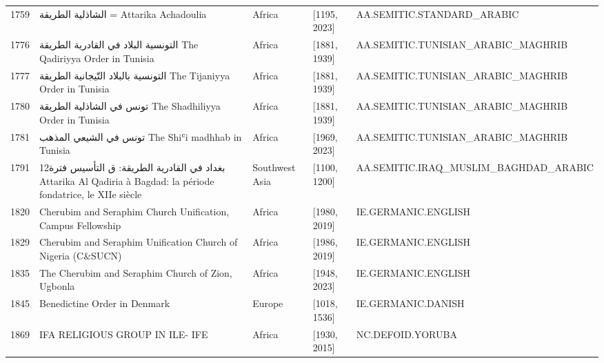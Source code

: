 {\begin{longtable}{rp{3.5cm}llp{3.5cm}}
1759 & {\raggedright {\arabicfont الشاذلية الطريقة} = Attarika Achadoulia} & Africa & [1195, 2023] & {\raggedright AA.\allowbreak{}SEMITIC.\allowbreak{}STANDARD\_\allowbreak{}ARABIC} \\
1776 & {\raggedright {\arabicfont التونسية البلاد في القادرية الطريقة} The Qadiriyya Order in Tunisia} & Africa & [1881, 1939] & {\raggedright AA.\allowbreak{}SEMITIC.\allowbreak{}TUNISIAN\_\allowbreak{}ARABIC\_\allowbreak{}MAGHRIB} \\
1777 & {\raggedright {\arabicfont التونسية بالبلاد التّيجانية الطريقة} The Tijaniyya Order in Tunisia} & Africa & [1881, 1939] & {\raggedright AA.\allowbreak{}SEMITIC.\allowbreak{}TUNISIAN\_\allowbreak{}ARABIC\_\allowbreak{}MAGHRIB} \\
1780 & {\raggedright {\arabicfont تونس في الشاذلية الطريقة} The Shadhiliyya Order in Tunisia} & Africa & [1881, 1939] & {\raggedright AA.\allowbreak{}SEMITIC.\allowbreak{}TUNISIAN\_\allowbreak{}ARABIC\_\allowbreak{}MAGHRIB} \\
1781 & {\raggedright {\arabicfont تونس في الشيعي المذهب} The Shiʿi madhhab in Tunisia} & Africa & [1969, 2023] & {\raggedright AA.\allowbreak{}SEMITIC.\allowbreak{}TUNISIAN\_\allowbreak{}ARABIC\_\allowbreak{}MAGHRIB} \\
1791 & {\raggedright {\arabicfont بغداد في القادرية الطريقة}: {\arabicfont ق التأسيس فترة}12 Attarika Al Qadiria à Bagdad: la période fondatrice, le XIIe siècle} & Southwest Asia & [1100, 1200] & {\raggedright AA.\allowbreak{}SEMITIC.\allowbreak{}IRAQ\_\allowbreak{}MUSLIM\_\allowbreak{}BAGHDAD\_\allowbreak{}ARABIC} \\
1820 & {\raggedright Cherubim and Seraphim Church Unification, Campus Fellowship} & Africa & [1980, 2019] & {\raggedright IE.\allowbreak{}GERMANIC.\allowbreak{}ENGLISH} \\
1829 & {\raggedright Cherubim and Seraphim Unification Church of Nigeria (C\&SUCN)} & Africa & [1986, 2019] & {\raggedright IE.\allowbreak{}GERMANIC.\allowbreak{}ENGLISH} \\
1835 & {\raggedright The Cherubim and Seraphim Church of Zion, Ugbonla} & Africa & [1948, 2023] & {\raggedright IE.\allowbreak{}GERMANIC.\allowbreak{}ENGLISH} \\
1845 & {\raggedright Benedictine Order in Denmark} & Europe & [1018, 1536] & {\raggedright IE.\allowbreak{}GERMANIC.\allowbreak{}DANISH} \\
1869 & {\raggedright IFA RELIGIOUS GROUP IN ILE- IFE} & Africa & [1930, 2015] & {\raggedright NC.\allowbreak{}DEFOID.\allowbreak{}YORUBA} \\

\end{longtable}}
